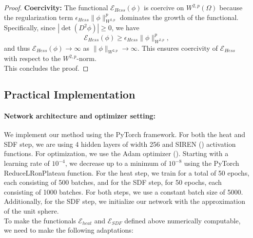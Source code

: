 \documentclass[12pt,openany]{book}
\theoremstyle{plainnormal}
\theoremstyle{remark}
\begin{document}
\begin{proof}


    \textbf{Coercivity:}  
    The functional \(\mathcal{E}_{Hess}(\phi)\) is coercive on \(W^{2,p}(\Omega)\) because the regularization term \(\epsilon_{Hess} \|\phi\|_{W^{2,p}}^p\) dominates the growth of the functional. Specifically, since \(|\det(D^2\phi)| \geq 0\), we have
    \[
    \mathcal{E}_{Hess}(\phi) \geq \epsilon_{Hess} \|\phi\|_{W^{2,p}}^p,
    \]
    and thus \(\mathcal{E}_{Hess}(\phi) \to \infty\) as \(\|\phi\|_{W^{2,p}} \to \infty\). This ensures coercivity of \(\mathcal{E}_{Hess}\) with respect to the \(W^{2,p}\)-norm.\\
    This concludes the proof.
\end{proof}
\subsection{Practical Implementation}\label{practicalImplememntation}
\paragraph{Network architecture and optimizer setting:} We implement our method using the PyTorch framework. For both the heat and SDF step, we are using 4 hidden layers of width 256 and SIREN (\cite{sitzmann2020implicitneuralrepresentationsperiodic}) activation functions. For optimization, we use the Adam optimizer (\cite{kingma2017adammethodstochasticoptimization}). Starting with a learning rate of $10^{-4}$, we decrease up to a minimum of $10^{-8}$ using the PyTorch ReduceLRonPlateau function. For the heat step, we train for a total of 50 epochs, each consisting of 500 batches, and for the SDF step, for 50 epochs, each consisting of 1000 batches. For both steps, we use a constant batch size of 5000. Additionally, for the SDF step, we initialize our network with the approximation of the unit sphere. \\
To make the functionals $\mathcal{E}_{heat}$ and $\mathcal{E}_{SDF}$ defined above numerically computable, we need to make the following adaptations:
\end{document}
